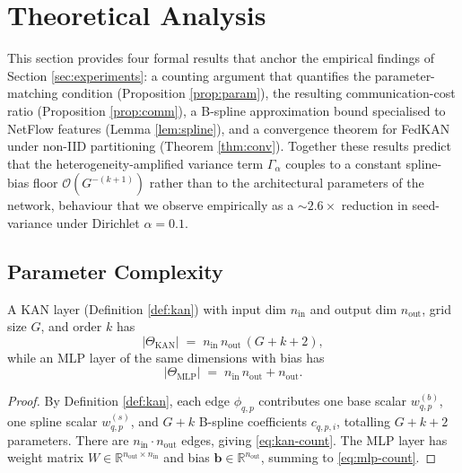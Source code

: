 \section{Theoretical Analysis}\label{sec:theory}

This section provides four formal results that anchor the empirical findings of Section \ref{sec:experiments}: a counting argument that quantifies the parameter-matching condition (Proposition \ref{prop:param}), the resulting communication-cost ratio (Proposition \ref{prop:comm}), a B-spline approximation bound specialised to NetFlow features (Lemma \ref{lem:spline}), and a convergence theorem for FedKAN under non-IID partitioning (Theorem \ref{thm:conv}). Together these results predict that the heterogeneity-amplified variance term $\Gamma_\alpha$ couples to a constant spline-bias floor $\mathcal{O}(G^{-(k+1)})$ rather than to the architectural parameters of the network, behaviour that we observe empirically as a $\sim 2.6\times$ reduction in seed-variance under Dirichlet $\alpha = 0.1$.

\subsection{Parameter Complexity}

\begin{proposition}\label{prop:param}
A KAN layer (Definition \ref{def:kan}) with input dim $n_{\text{in}}$ and output dim $n_{\text{out}}$, grid size $G$, and order $k$ has
\begin{equation}\label{eq:kan-count}
|\Theta_{\text{KAN}}| \;=\; n_{\text{in}}\, n_{\text{out}} \,(G + k + 2),
\end{equation}
while an MLP layer of the same dimensions with bias has
\begin{equation}\label{eq:mlp-count}
|\Theta_{\text{MLP}}| \;=\; n_{\text{in}}\, n_{\text{out}} + n_{\text{out}}.
\end{equation}
\end{proposition}

\begin{proof}
By Definition \ref{def:kan}, each edge $\phi_{q,p}$ contributes one base scalar $w^{(b)}_{q,p}$, one spline scalar $w^{(s)}_{q,p}$, and $G+k$ B-spline coefficients $c_{q,p,i}$, totalling $G+k+2$ parameters. There are $n_{\text{in}}\cdot n_{\text{out}}$ edges, giving \eqref{eq:kan-count}. The MLP layer has weight matrix $W \in \mathbb{R}^{n_{\text{out}} \times n_{\text{in}}}$ and bias $\mathbf{b} \in \mathbb{R}^{n_{\text{out}}}$, summing to \eqref{eq:mlp-count}.
\end{proof}

